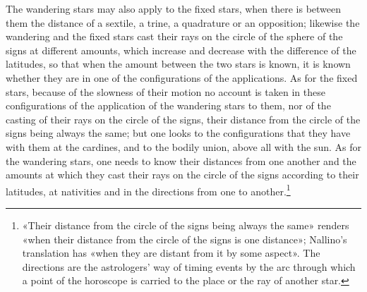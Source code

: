 \documentclass[11pt]{article}
\begin{document}
\par The wandering stars may also apply to the fixed stars, when there is between them the distance of a sextile, a trine, a quadrature or an opposition; likewise the wandering and the fixed stars cast their rays on the circle of the sphere of the signs at different amounts, which increase and decrease with the difference of the latitudes, so that when the amount between the two stars is known, it is known whether they are in one of the configurations of the applications. As for the fixed stars, because of the slowness of their motion no account is taken in these configurations of the application of the wandering stars to them, nor of the casting of their rays on the circle of the signs, their distance from the circle of the signs being always the same; but one looks to the configurations that they have with them at the cardines, and to the bodily union, above all with the sun. As for the wandering stars, one needs to know their distances from one another and the amounts at which they cast their rays on the circle of the signs according to their latitudes, at nativities and in the directions from one to another.\footnote{«Their distance from the circle of the signs being always the same» renders «when their distance from the circle of the signs is one distance»; Nallino's translation has «when they are distant from it by some aspect». The directions are the astrologers' way of timing events by the arc through which a point of the horoscope is carried to the place or the ray of another star.}\par
\end{document}
